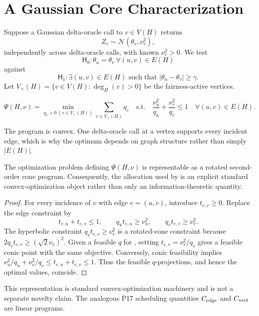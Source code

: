 \section{A Gaussian Core Characterization}
\label{sec:gaussian}

Suppose a Gaussian delta-oracle call to $v\in V(H)$ returns
\[
Z_v\sim\mathcal{N}(\theta_v,\nu_v^2),
\]
independently across delta-oracle calls, with known $\nu_v^2>0$.  We test
\[
\mathsf H_0:\theta_u=\theta_v\ \forall (u,v)\in E(H)
\]
against
\[
\mathsf H_1:\exists (u,v)\in E(H)
\text{ such that }|\theta_u-\theta_v|\ge\gamma.
\]
Let $V_+(H)=\{v\in V(H):\deg_H(v)>0\}$ be the fairness-active vertices.

\begin{definition}
\label{def:psi}
\[
\Psi(H,\nu)=
\min_{q_v>0\ (v\in V_+(H))}\sum_{v\in V_+(H)}q_v
\quad\text{s.t.}\quad
\frac{\nu_u^2}{q_u}+\frac{\nu_v^2}{q_v}\le1
\quad\forall (u,v)\in E(H).
\]
\end{definition}

The program is convex.  One delta-oracle call at a vertex supports every incident edge,
which is why the optimum depends on graph structure rather than simply $|E(H)|$.

\begin{proposition}
\label{prop:psi-soc}
The optimization problem defining $\Psi(H,\nu)$ is representable as a rotated
second-order cone program.  Consequently, the allocation used by
 is an explicit standard convex-optimization object rather than
only an information-theoretic quantity.
\end{proposition}

\begin{proof}
For every incidence of $v$ with edge $e=(u,v)$, introduce $t_{e,v}\ge0$.
Replace the edge constraint by
\[
t_{e,u}+t_{e,v}\le1,
\qquad
q_u t_{e,u}\ge \nu_u^2,
\qquad
q_v t_{e,v}\ge \nu_v^2.
\]
The hyperbolic constraint $q_vt_{e,v}\ge\nu_v^2$ is a rotated-cone
constraint because
$2q_vt_{e,v}\ge(\sqrt{2}\nu_v)^2$.
Given a feasible $q$ for , setting
$t_{e,v}=\nu_v^2/q_v$ gives a feasible conic point with the same objective.
Conversely, conic feasibility implies
$\nu_u^2/q_u+\nu_v^2/q_v\le t_{e,u}+t_{e,v}\le1$.
Thus the feasible $q$-projections, and hence the optimal values, coincide.
\end{proof}

This representation is standard convex-optimization machinery and is not a
separate novelty claim.  The analogous P17 scheduling quantities
$C_{\rm edge}$ and $C_{\rm vert}$ are linear programs.


